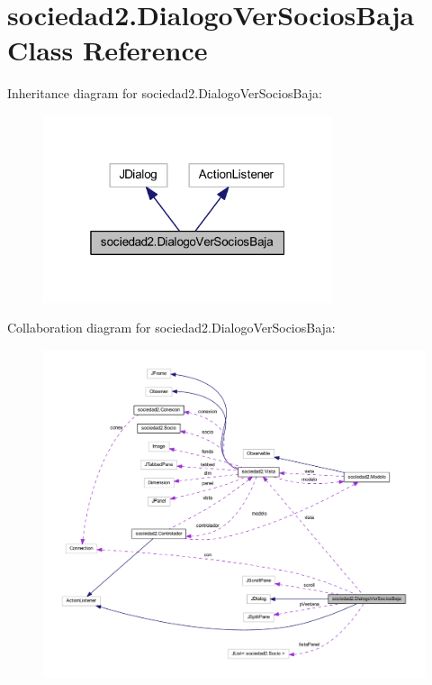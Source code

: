 \hypertarget{classsociedad2_1_1_dialogo_ver_socios_baja}{}\section{sociedad2.\+Dialogo\+Ver\+Socios\+Baja Class Reference}
\label{classsociedad2_1_1_dialogo_ver_socios_baja}


Inheritance diagram for sociedad2.\+Dialogo\+Ver\+Socios\+Baja\+:\nopagebreak
\begin{figure}[H]
\begin{center}
\leavevmode
\includegraphics[width=241pt]{classsociedad2_1_1_dialogo_ver_socios_baja__inherit__graph}
\end{center}
\end{figure}


Collaboration diagram for sociedad2.\+Dialogo\+Ver\+Socios\+Baja\+:
\nopagebreak
\begin{figure}[H]
\begin{center}
\leavevmode
\includegraphics[width=350pt]{classsociedad2_1_1_dialogo_ver_socios_baja__coll__graph}
\end{center}
\end{figure}
